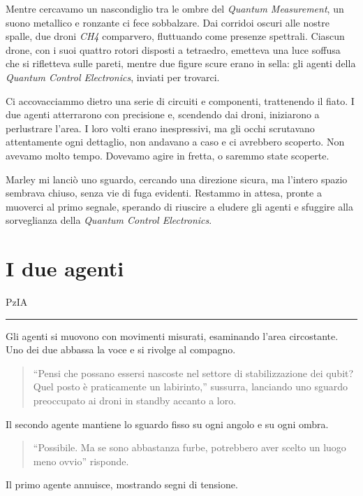 Mentre cercavamo un nascondiglio tra le ombre del \textit{Quantum Measurement}, un suono metallico e ronzante ci fece sobbalzare. Dai corridoi oscuri alle nostre spalle, due droni \textit{CH4} comparvero, fluttuando come presenze spettrali. Ciascun drone, con i suoi quattro rotori disposti a tetraedro, emetteva una luce soffusa che si rifletteva sulle pareti, mentre due figure scure erano in sella: gli agenti della \textit{Quantum Control Electronics}, inviati per trovarci.

Ci accovacciammo dietro una serie di circuiti e componenti, trattenendo il fiato. I due agenti atterrarono con precisione e, scendendo dai droni, iniziarono a perlustrare l'area. I loro volti erano inespressivi, ma gli occhi scrutavano attentamente ogni dettaglio,  non andavano a caso e ci avrebbero scoperto.  Non avevamo molto tempo. Dovevamo agire in fretta, o saremmo state scoperte.

Marley mi lanciò uno sguardo, cercando una direzione sicura, ma l'intero spazio sembrava chiuso, senza vie di fuga evidenti. Restammo in attesa, pronte a muoverci al primo segnale, sperando di riuscire a eludere gli agenti e sfuggire alla sorveglianza della \textit{Quantum Control Electronics}.

\section{I due agenti}
\vspace{1em}
\begin{center}PzIA\end{center}
\hrule
\vspace{1em}
Gli agenti si muovono con movimenti misurati, esaminando l'area circostante. Uno dei due abbassa la voce e si rivolge al compagno.

\begin{quote}
\enquote{Pensi che possano essersi nascoste nel settore di stabilizzazione dei qubit? Quel posto è praticamente un labirinto,} sussurra, lanciando uno sguardo preoccupato ai droni in standby accanto a loro.
\end{quote}

Il secondo agente mantiene lo sguardo fisso su ogni angolo e su ogni ombra.

\begin{quote}
\enquote{Possibile. Ma se sono abbastanza furbe, potrebbero aver scelto un luogo meno ovvio} risponde.
\end{quote}

Il primo agente annuisce, mostrando segni di tensione.

